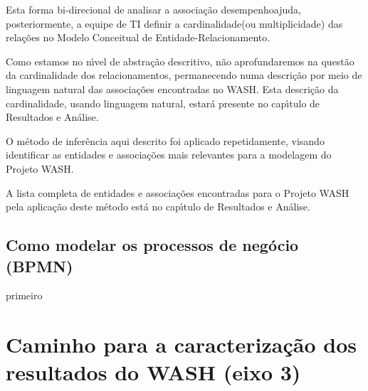 \documentclass[
12pt,		%
openright,	%
twoside,  %
a4paper,			%
chapter=TITLE,		%
english,			%
french,				%
spanish,			%
brazil				%
]{USPSC-classe/USPSC}
\begin{document}
Esta forma bi-direcional de analisar a associa\c{c}\~ao \textquotedbl desempenho\textquotedbl  ajuda, posteriormente, a equipe de TI definir a \textquotedbl cardinalidade\textquotedbl  (ou multiplicidade) das rela\c{c}\~oes no Modelo Conceitual de Entidade-Relacionamento.










Como estamos no n\'{\i}vel de abstra\c{c}\~ao descritivo, n\~ao aprofundaremos na quest\~ao da cardinalidade dos relacionamentos, permanecendo numa descri\c{c}\~ao por meio de linguagem natural das associa\c{c}\~oes encontradas no WASH. Esta descri\c{c}\~ao da cardinalidade, usando linguagem natural, estar\'a presente no cap\'{\i}tulo de Resultados e An\'alise.










O m\'etodo de infer\^encia aqui descrito foi aplicado repetidamente, visando identificar as entidades e associa\c{c}\~oes mais relevantes para a modelagem do Projeto WASH.










A lista completa de entidades e associa\c{c}\~oes encontradas para o Projeto WASH pela aplica\c{c}\~ao deste m\'etodo est\'a no cap\'{\i}tulo de Resultados e An\'alise.










\subsection[Como modelar os processos de neg\'ocio (BPMN)]{Como modelar os processos de neg\'ocio (BPMN)}\label{Como modelar os processos de neg\'ocio (BPMN)}
primeiro










\section[Caminho para a caracteriza\c{c}\~ao dos resultados do WASH (eixo 3)]{Caminho para a caracteriza\c{c}\~ao dos resultados do WASH (eixo 3)}\label{Caminho para a caracteriza\c{c}\~ao dos resultados do WASH (eixo 3)}
\end{document}
